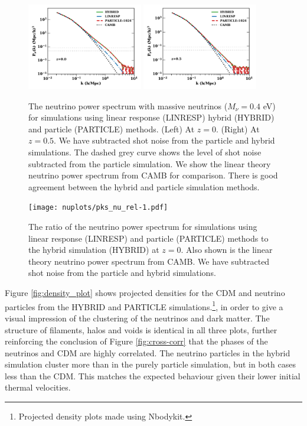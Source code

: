 \documentclass[useAMS, usenatbib]{mnras}
\begin{document}
\begin{figure}
\includegraphics[width=0.45\textwidth]{nuplots/pks-nu-1.pdf}
\includegraphics[width=0.45\textwidth]{nuplots/pks-nu-0_6667.pdf}
  \caption{The neutrino power spectrum with massive neutrinos ($M_\nu = 0.4$ eV) for simulations using linear response (LINRESP) hybrid (HYBRID) and particle (PARTICLE) methods. (Left) At $z=0$. (Right) At $z=0.5$. We have subtracted shot noise from the particle and hybrid simulations. The dashed grey curve shows the level of shot noise subtracted from the particle simulation. We show the linear theory neutrino power spectrum from CAMB for comparison. There is good agreement between the hybrid and particle simulation methods.}
  \label{fig:neutrino_power}
\end{figure}

\begin{figure}
\texttt{[image: nuplots/pks\_nu\_rel-1.pdf]}
  \caption{The ratio of the neutrino power spectrum for simulations using linear response (LINRESP) and particle (PARTICLE) methods to the hybrid simulation (HYBRID) at $z=0$. Also shown is the linear theory neutrino power spectrum from CAMB. We have subtracted shot noise from the particle and hybrid simulations.}
  \label{fig:rel_neutrino_power}
\end{figure}

Figure \ref{fig:density_plot} shows projected densities for the CDM and neutrino particles from the HYBRID and PARTICLE simulations.\footnote{Projected density plots made using Nbodykit.}, in order to give a visual impression of the clustering of the neutrinos and dark matter. The structure of filaments, halos and voids is identical in all three plots, further reinforcing the conclusion of Figure \ref{fig:cross-corr} that the phases of the neutrinos and CDM are highly correlated. The neutrino particles in the hybrid simulation cluster more than in the purely particle simulation, but in both cases less than the CDM. This matches the expected behaviour given their lower initial thermal velocities.
\end{document}
